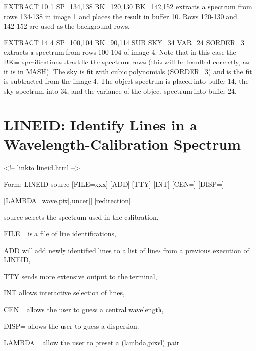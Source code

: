 \begin{example}
  \item[EXTRACT 10 1 SP=134,138 BK=120,130 BK=142,152\hfill]{ extracts a
       spectrum from rows 134-138 in image 1 and places the result in
       buffer 10.  Rows 120-130 and 142-152 are used as the background
       rows.}

  \item[EXTRACT 14 4 SP=100,104 BK=90,114 SUB SKY=34 VAR=24
       SORDER=3\hfill]{ extracts a spectrum from rows 100-104 of image 4.
       Note that in this case the BK= specifications straddle the spectrum
       rows (this will be handled correctly, as it is in MASH).  The sky is
       fit with cubic polynomials (SORDER=3) and is the fit is subtracted
       from the image 4.  The object spectrum is placed into buffer 14, the
       sky spectrum into 34, and the variance of the object spectrum into
       buffer 24.}
\end{example}

\section{LINEID: Identify Lines in a Wavelength-Calibration Spectrum}
\begin{rawhtml}
<!-- linkto lineid.html -->
\end{rawhtml}
\begin{command}
  \item[Form: LINEID source {[FILE=xxx]} {[ADD]} {[TTY]} {[INT]} {[CEN=]} 
       {[DISP=]}\hfill]{}
  \item{{[LAMBDA=wave,pix{[,uncer]}]} {[redirection]}}
  \item[source]{selects the spectrum used in the calibration,}
  \item[FILE=]{is a file of line identifications,}
  \item[ADD]{will add newly identified lines to a list
       of lines from a previous execution of LINEID,}
  \item[TTY]{sends more extensive output to the terminal,}
  \item[INT]{allows interactive selection of lines,}
  \item[CEN=]{allows the user to guess a central wavelength,}
  \item[DISP=]{allows the user to guess a dispersion.}
  \item[LAMBDA=]{allow the user to preset a (lambda,pixel) pair}
\end{command}

